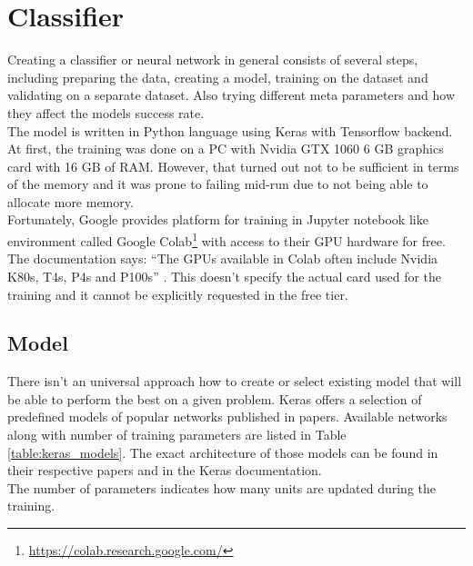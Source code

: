 \documentclass[thesis=M,english]{FITthesis}[2019/03/06]
\begin{document}
\section{Classifier}
Creating a classifier or neural network in general consists of several steps, including preparing the data, creating a model, training on the dataset and validating on a separate dataset. Also trying different meta parameters and how they affect the models success rate.\\

The model is written in Python language using Keras with Tensorflow backend. At first, the training was done on a PC with Nvidia GTX 1060 6 GB graphics card with 16 GB of RAM. However, that turned out not to be sufficient in terms of the memory and it was prone to failing mid-run due to not being able to allocate more memory. \\

Fortunately, Google provides platform for training in Jupyter notebook like environment called Google Colab\footnote{\url{https://colab.research.google.com/}} with access to their GPU hardware for free. The documentation says: \enquote{The GPUs available in Colab often include Nvidia K80s, T4s, P4s and P100s} \cite{cit:colab_gpu}. This doesn't specify the actual card used for the training and it cannot be explicitly requested in the free tier. 

\subsection{Model}
There isn't an universal approach how to create or select existing model that will be able to perform the best on a given problem. Keras offers a selection of predefined models of popular networks published in papers. Available networks along with number of training parameters are listed in Table \ref{table:keras_models}. The exact architecture of those models can be found in their respective papers and in the Keras documentation.\\

The number of parameters indicates how many units are updated during the training. \\
\end{document}
